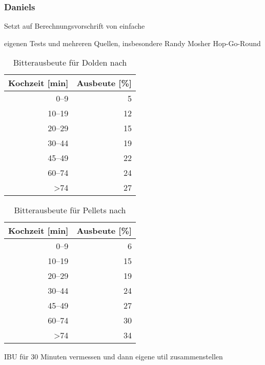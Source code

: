 \documentclass[a4paper,parskip=half]{scrartcl}
\begin{document}
\subsubsection*{Daniels}

\parencite[80]{Daniels1996}
Setzt auf Berechnungsvorschrift von \citeauthor{Rager1990}
einfache

eigenen Tests und mehreren Quellen, insbesondere Randy Mosher
Hop-Go-Round

\begin{table}[H]
\centering
\begin{tabular}{rr}
\toprule
\multicolumn{1}{c}{\textbf{Kochzeit [min]}} & \multicolumn{1}{c}{\textbf{Ausbeute [\%]}} \\
\midrule
0–9            & 5  \\
10–19          & 12 \\
20–29          & 15 \\
30–44          & 19 \\
45–49          & 22 \\
60–74          & 24 \\
>74            & 27 \\
\bottomrule
\end{tabular}
\caption{Bitterausbeute für Dolden nach \citeauthor{Daniels1996} \parencite[80]{Daniels1996}}
\label{table:danielsutil}
\end{table}

\begin{table}[H]
\centering
\begin{tabular}{rr}
\toprule
\multicolumn{1}{c}{\textbf{Kochzeit [min]}} & \multicolumn{1}{c}{\textbf{Ausbeute [\%]}} \\
\midrule
0–9            & 6 \\
10–19          & 15 \\
20–29          & 19 \\
30–44          & 24 \\
45–49          & 27 \\
60–74          & 30 \\
>74            & 34 \\
\bottomrule
\end{tabular}
\caption{Bitterausbeute für Pellets nach \citeauthor{Daniels1996} \parencite[80]{Daniels1996}}
\label{table:danielsutilpellets}
\end{table}

\parencite[85]{Daniels1996}
IBU für 30 Minuten vermessen und dann eigene util zusammenstellen
\end{document}
